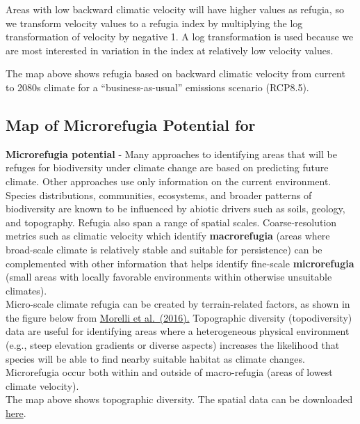 \documentclass[
]{article}
\begin{document}
Areas with low backward climatic velocity will have higher values as
refugia, so we transform velocity values to a refugia index by
multiplying the log transformation of velocity by negative 1. A log
transformation is used because we are most interested in variation in
the index at relatively low velocity values.

The map above shows refugia based on backward climatic velocity from
current to 2080s climate for a ``business-as-usual'' emissions scenario
(RCP8.5).

\pagebreak

\hypertarget{map-of-microrefugia-potential-for}{%
\subsection{Map of Microrefugia Potential
for}\label{map-of-microrefugia-potential-for}}

\textbf{Microrefugia potential} - Many approaches to identifying areas
that will be refuges for biodiversity under climate change are based on
predicting future climate. Other approaches use only information on the
current environment. Species distributions, communities, ecosystems, and
broader patterns of biodiversity are known to be influenced by abiotic
drivers such as soils, geology, and topography. Refugia also span a
range of spatial scales. Coarse-resolution metrics such as climatic
velocity which identify \textbf{macrorefugia} (areas where broad-scale
climate is relatively stable and suitable for persistence) can be
complemented with other information that helps identify fine-scale
\textbf{microrefugia} (small areas with locally favorable environments
within otherwise unsuitable climates).\\
Micro-scale climate refugia can be created by terrain-related factors,
as shown in the figure below from
\href{https://journals.plos.org/plosone/article?id=10.1371/journal.pone.0159909}{Morelli
et al.~(2016).} Topographic diversity (topodiversity) data are useful
for identifying areas where a heterogeneous physical environment (e.g.,
steep elevation gradients or diverse aspects) increases the likelihood
that species will be able to find nearby suitable habitat as climate
changes.\\
Microrefugia occur both within and outside of macro-refugia (areas of
lowest climate velocity).\\
The map above shows topographic diversity. The spatial data can be
downloaded
\href{https://adaptwest.databasin.org/pages/environmental-diversity-north-america}{here}.
\end{document}
